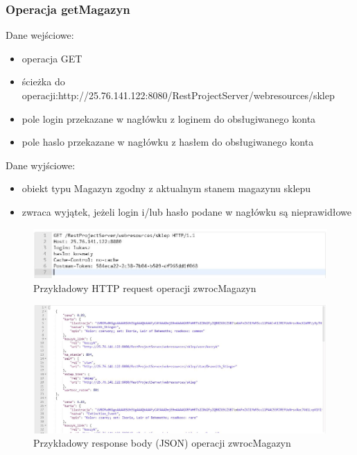\documentclass[11pt]{article}   %
\begin{document}
\subsubsection{Operacja getMagazyn}
Dane wejściowe:
\begin{itemize}
	\item operacja GET
	\item ścieżka do operacji:http://25.76.141.122:8080/RestProjectServer/webresources/sklep
	\item pole login przekazane w nagłówku z loginem do obsługiwanego konta
	\item pole haslo przekazane w nagłówku z hasłem do obsługiwanego konta
\end{itemize}	
Dane wyjściowe:
\begin{itemize}
	\item obiekt typu Magazyn zgodny z aktualnym stanem magazynu sklepu
	\item zwraca wyjątek, jeżeli login i/lub hasło podane w nagłówku są nieprawidłowe

\end{itemize}


\begin{figure}[H]
	\centering
	\includegraphics[width=0.8\linewidth]{komunikaty_zdjecia_rest/getMagazyn_req}
	\caption{Przykładowy HTTP request operacji zwrocMagazyn}
	\label{zrzut21}
\end{figure}
\begin{figure}[H]
	\centering
	\includegraphics[width=0.8\linewidth]{komunikaty_zdjecia_rest/getMagazyn_res_body}
	\caption{Przykładowy response body (JSON) operacji zwrocMagazyn}
	\label{zrzut22}
\end{figure}
\end{document}
